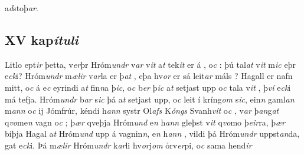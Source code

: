a\textit{d}stoþ\textit{ar}.  
\pend 
\endnumbering  
\beginnumbering 
\pstart  
\vspace{5mm}\subsection*{XV kap\textit{ítuli}} 
Litlo ept\textit{ir} þetta, 
v\textit{er}þr Hróm\textit{undr} v\textit{ar} v\textit{it}  a\textit{t} tek\textit{it} er á  ,  
o\textit{c} :   þú tal\textit{at} v\textit{it} m\textit{ic}  eþr e\textit{ck}i? Hróm\textit{undr} m\textit{ælir} v\textit{ar}la er þ\textit{at}   , eþa hv\textit{or} er sá   leit\textit{ar} máls  ?   Hagall er nafn mitt, o\textit{c} á e\textit{c} eyrindi a\textit{t} fin\textit{n}a þ\textit{ic}, o\textit{c}
b\textit{er} þ\textit{ic} a\textit{t} setjast upp o\textit{c} tala
v\textit{it} ,  þ\textit{ví} e\textit{ck}i má  tefja. 
Hróm\textit{undr} b\textit{ar} s\textit{ic} þá a\textit{t}
setjast upp, o\textit{c} leit  í kríng\textit{om} s\textit{ic},    ein\textit{n} gaml\textit{an} m\textit{ann} o\textit{c} ij Jómfrúr, kéndi h\textit{ann}  systr Ol\textit{afs} K\textit{óngs} Svanh\textit{vít} o\textit{c} , v\textit{ar} þ\textit{an}g\textit{at} q\textit{vo}me\textit{n} vagn o\textit{c} ; þ\textit{ær} qveþja Hróm\textit{und} e\textit{n} h\textit{ann} gleþst
v\textit{it} q\textit{vo}mo  þ\textit{eir}ra, þ\textit{ær} biþja
Hagal a\textit{t}  Hróm\textit{und} upp á vagnin\textit{n}, e\textit{n}
h\textit{ann} , vildi þá  Hróm\textit{undr} uppst\textit{an}da,   gat e\textit{ck}i. Þá m\textit{ælir} Hróm\textit{undr} k\textit{ar}li  hv\textit{or}j\textit{om}  ỏrv\textit{er}pi, o\textit{c} sama hend\textit{ir}
